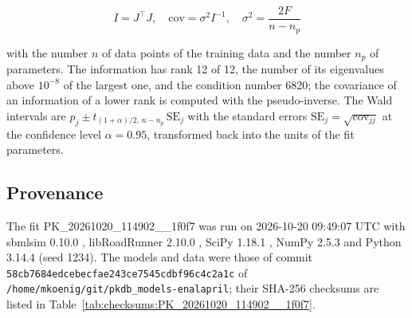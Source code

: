 \documentclass{article}
\begin{document}
\begin{equation}
I = J^\top J, \quad \mathrm{cov} = \sigma^2 I^{-1}, \quad \sigma^2 = \frac{2 F}{n - n_p}
\end{equation}

with the number $n$ of data points of the training data and the number $n_p$ of parameters. The information has rank 12 of 12, the number of its eigenvalues above $10^{-8}$ of the largest one, and the condition number 6820; the covariance of an information of a lower rank is computed with the pseudo-inverse. The Wald intervals are $\hat{p}_j \pm t_{(1+\alpha)/2,\, n-n_p}\, \mathrm{SE}_j$ with the standard errors $\mathrm{SE}_j = \sqrt{\mathrm{cov}_{jj}}$ at the confidence level $\alpha = 0.95$, transformed back into the units of the fit parameters.

\subsection{Provenance}

The fit PK\_20261020\_114902\_\_1f0f7 was run on 2026-10-20 09:49:07 UTC with sbmlsim 0.10.0 \cite{Koenig2026_sbmlsim}, libRoadRunner 2.10.0 \cite{Welsh2023}, SciPy 1.18.1 \cite{Virtanen2020}, NumPy 2.5.3 \cite{Harris2020} and Python 3.14.4 (seed 1234). The models and data were those of commit \texttt{58cb7684edcebecfae243ce7545cdbf96c4c2a1c} of \texttt{/home/mkoenig/git/pkdb\_models-enalapril}; their SHA-256 checksums are listed in Table~\ref{tab:checksums:PK_20261020_114902__1f0f7}.
\end{document}
